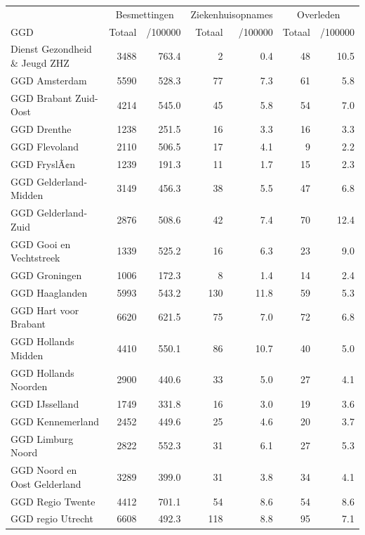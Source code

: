 \documentclass[
  english,
  man,floatsintext]{apa6}
\begin{document}
\begin{table}[H]
\centering\begingroup\fontsize{10}{12}\selectfont

\begin{threeparttable}
\begin{tabular}{lrrrrrr}
\toprule
\multicolumn{1}{c}{ } & \multicolumn{2}{c}{Besmettingen} & \multicolumn{2}{c}{Ziekenhuisopnames} & \multicolumn{2}{c}{Overleden} \\
\cmidrule(l{3pt}r{3pt}){2-3} \cmidrule(l{3pt}r{3pt}){4-5} \cmidrule(l{3pt}r{3pt}){6-7}
GGD & Totaal & /100000 & Totaal & /100000 & Totaal & /100000\\
\midrule
Dienst Gezondheid \& Jeugd ZHZ & 3488 & 763.4 & 2 & 0.4 & 48 & 10.5\\
GGD Amsterdam & 5590 & 528.3 & 77 & 7.3 & 61 & 5.8\\
GGD Brabant Zuid-Oost & 4214 & 545.0 & 45 & 5.8 & 54 & 7.0\\
GGD Drenthe & 1238 & 251.5 & 16 & 3.3 & 16 & 3.3\\
GGD Flevoland & 2110 & 506.5 & 17 & 4.1 & 9 & 2.2\\
GGD FryslÃ¢n & 1239 & 191.3 & 11 & 1.7 & 15 & 2.3\\
GGD Gelderland-Midden & 3149 & 456.3 & 38 & 5.5 & 47 & 6.8\\
GGD Gelderland-Zuid & 2876 & 508.6 & 42 & 7.4 & 70 & 12.4\\
GGD Gooi en Vechtstreek & 1339 & 525.2 & 16 & 6.3 & 23 & 9.0\\
GGD Groningen & 1006 & 172.3 & 8 & 1.4 & 14 & 2.4\\
GGD Haaglanden & 5993 & 543.2 & 130 & 11.8 & 59 & 5.3\\
GGD Hart voor Brabant & 6620 & 621.5 & 75 & 7.0 & 72 & 6.8\\
GGD Hollands Midden & 4410 & 550.1 & 86 & 10.7 & 40 & 5.0\\
GGD Hollands Noorden & 2900 & 440.6 & 33 & 5.0 & 27 & 4.1\\
GGD IJsselland & 1749 & 331.8 & 16 & 3.0 & 19 & 3.6\\
GGD Kennemerland & 2452 & 449.6 & 25 & 4.6 & 20 & 3.7\\
GGD Limburg Noord & 2822 & 552.3 & 31 & 6.1 & 27 & 5.3\\
GGD Noord en Oost Gelderland & 3289 & 399.0 & 31 & 3.8 & 34 & 4.1\\
GGD Regio Twente & 4412 & 701.1 & 54 & 8.6 & 54 & 8.6\\
GGD regio Utrecht & 6608 & 492.3 & 118 & 8.8 & 95 & 7.1\\

\end{tabular}
\end{threeparttable}
\end{table}
\end{document}
